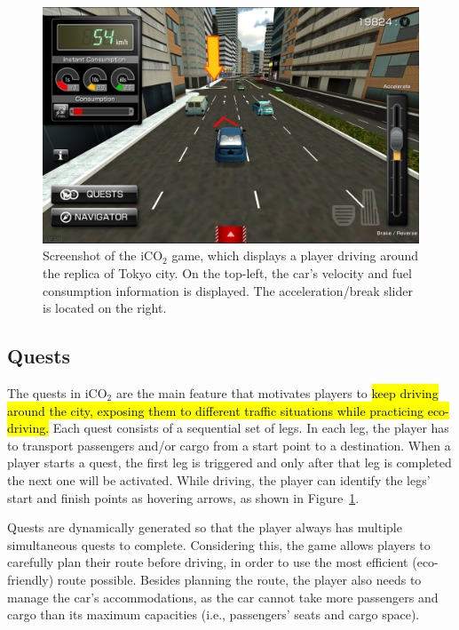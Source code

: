 \documentclass[preprint,authoryear,12pt]{elsarticle}
\newcommand{\hlc}[2][yellow]{ {\sethlcolor{#1} \hl{#2}} }
\begin{document}
\begin{figure}[htb]
\begin{center}
\includegraphics[width=.95\linewidth]{ijhcs14-img/iCO2_driving}
\caption{Screenshot of the iCO$_2$ game, which displays a player driving around the replica of Tokyo city. On the top-left, the car's velocity and fuel consumption information is displayed. The acceleration/break slider is located on the right.\label{fig:iCO2_driving}}
\end{center}
\end{figure}

\subsection{Quests}

The quests in iCO$_2$ are the main feature that motivates players to
\hlc[green]{ keep driving around the city, exposing them to different traffic situations
	while practicing eco-driving.} Each quest consists of a sequential set of legs. In each leg, the player has to transport passengers and/or cargo from a start point to a destination. When a player starts a quest, the first leg is triggered and only after that leg is completed the next one will be activated. While driving, the player can identify the legs' start and finish points as hovering arrows, as shown in Figure~\ref{fig:iCO2_driving}.

Quests are dynamically generated so that the player always has multiple simultaneous quests to complete. Considering this, the game allows players to carefully plan their route before driving, in order to use the most efficient (eco-friendly) route possible. Besides planning the route, the player also needs to manage the car's accommodations, as the car cannot take more passengers and cargo than its maximum capacities (i.e., passengers' seats and cargo space).
\end{document}
